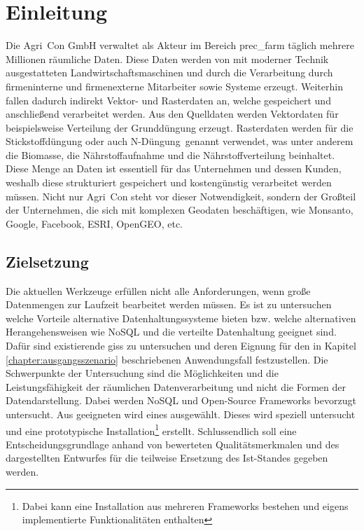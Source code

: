 \chapter{Einleitung}
Die Agri~Con GmbH verwaltet als Akteur im Bereich \Gls{prec_farm} täglich mehrere Millionen räumliche Daten. Diese Daten werden von mit moderner Technik ausgestatteten Landwirtschaftsmaschinen und durch die Verarbeitung durch firmeninterne und firmenexterne Mitarbeiter sowie Systeme erzeugt. Weiterhin fallen dadurch indirekt Vektor- und Rasterdaten an, welche gespeichert und anschließend verarbeitet werden.
Aus den Quelldaten werden Vektordaten für beispielsweise Verteilung der Grunddüngung erzeugt. Rasterdaten werden für die Stickstoffdüngung oder auch \glqq N-Düngung\grqq\ genannt verwendet, was unter anderem die Biomasse, die Nährstoffaufnahme und die Nährstoffverteilung beinhaltet.
Diese Menge an Daten ist essentiell für das Unternehmen und dessen Kunden, weshalb diese strukturiert gespeichert und kostengünstig verarbeitet werden müssen. Nicht nur Agri~Con steht vor dieser Notwendigkeit, sondern der Großteil der Unternehmen, die sich mit komplexen Geodaten beschäftigen, wie Monsanto, Google, Facebook, ESRI, OpenGEO, etc.




\section{Zielsetzung}

Die aktuellen Werkzeuge erfüllen nicht alle Anforderungen, wenn große Datenmengen zur Laufzeit bearbeitet werden müssen. Es ist zu untersuchen welche Vorteile alternative Datenhaltungssysteme bieten bzw. welche alternativen Herangehensweisen wie NoSQL und die verteilte Datenhaltung geeignet sind.
Dafür sind existierende \Glspl{gis} zu untersuchen und deren Eignung für den in Kapitel \ref{chapter:ausgangsszenario} beschriebenen Anwendungsfall festzustellen. Die Schwerpunkte der Untersuchung sind die Möglichkeiten und die Leistungsfähigkeit der räumlichen Datenverarbeitung und nicht die Formen der Datendarstellung.
Dabei werden NoSQL und Open-Source Frameworks bevorzugt untersucht.
Aus geeigneten wird eines ausgewählt. Dieses wird speziell untersucht und eine prototypische Installation\footnote{Dabei kann eine Installation aus mehreren Frameworks bestehen und eigens implementierte Funktionalitäten enthalten} erstellt.
Schlussendlich soll eine Entscheidungsgrundlage anhand von bewerteten Qualitätsmerkmalen und des dargestellten Entwurfes für die teilweise Ersetzung des Ist-Standes gegeben werden.

